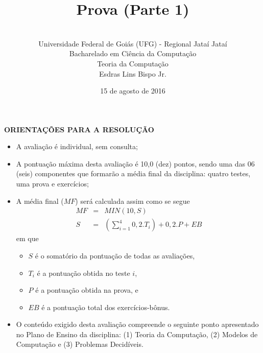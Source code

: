 \documentclass[12pt,a4paper,oneside]{article}
\author{\\Universidade Federal de Goiás (UFG) - Regional Jataí Jataí\\Bacharelado em Ciência da Computação \\Teoria da Computação \\Esdras Lins Bispo Jr.}
\date{15 de agosto de 2016}
\title{\sc \huge Prova (Parte 1)}
\begin{document}
\maketitle

{\bf ORIENTAÇÕES PARA A RESOLUÇÃO}

\begin{itemize}
	\item A avaliação é individual, sem consulta;
	\item A pontuação máxima desta avaliação é 10,0 (dez) pontos, sendo uma das 06 (seis) componentes que formarão a média final da disciplina: quatro testes, uma prova e exercícios;
	\item A média final ($MF$) será calculada assim como se segue
	\begin{eqnarray}
		MF & = & MIN(10, S) \nonumber \\
		S & = & (\sum_{i=1}^{4} 0,2.T_i ) + 0,2.P  + EB \nonumber
	\end{eqnarray}
	em que 
	\begin{itemize}
		\item $S$ é o somatório da pontuação de todas as avaliações,
		\item $T_i$ é a pontuação obtida no teste $i$,
		\item $P$ é a pontuação obtida na prova, e
		\item $EB$ é a pontuação total dos exercícios-bônus.
	\end{itemize}
	\item O conteúdo exigido desta avaliação compreende o seguinte ponto apresentado no Plano de Ensino da disciplina:  (1) Teoria da Computação, (2) Modelos de Computação e (3) Problemas Decidíveis.
\end{itemize}

\begin{center}
\end{center}

\newpage
\end{document}
